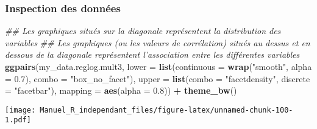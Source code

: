 \documentclass[
]{book}
\newenvironment{Shaded}{\begin{snugshade}}{\end{snugshade}}
\newcommand{\CommentTok}[1]{\textcolor[rgb]{0.56,0.35,0.01}{\textit{#1}}}
\newcommand{\DataTypeTok}[1]{\textcolor[rgb]{0.13,0.29,0.53}{#1}}
\newcommand{\FloatTok}[1]{\textcolor[rgb]{0.00,0.00,0.81}{#1}}
\newcommand{\KeywordTok}[1]{\textcolor[rgb]{0.13,0.29,0.53}{\textbf{#1}}}
\newcommand{\NormalTok}[1]{#1}
\newcommand{\OperatorTok}[1]{\textcolor[rgb]{0.81,0.36,0.00}{\textbf{#1}}}
\newcommand{\StringTok}[1]{\textcolor[rgb]{0.31,0.60,0.02}{#1}}
\begin{document}
\begin{Shaded}
\end{Shaded}

\hypertarget{inspection-des-donnuxe9es-10}{%
\subsubsection{Inspection des données}\label{inspection-des-donnuxe9es-10}}

\begin{Shaded}
\begin{Highlighting}[]
\CommentTok{## Les graphiques situés sur la diagonale représentent la distribution des variables}
\CommentTok{## Les graphiques (ou les valeurs de corrélation) situés au dessus et en dessous de la diagonale représentent l'association entre les différentes variables}
\KeywordTok{ggpairs}\NormalTok{(my_data.reglog.mult3,}
        \DataTypeTok{lower =} \KeywordTok{list}\NormalTok{(}\DataTypeTok{continuous =} \KeywordTok{wrap}\NormalTok{(}\StringTok{"smooth"}\NormalTok{, }\DataTypeTok{alpha =} \FloatTok{0.7}\NormalTok{), }\DataTypeTok{combo =} \StringTok{"box_no_facet"}\NormalTok{),}
        \DataTypeTok{upper =} \KeywordTok{list}\NormalTok{(}\DataTypeTok{combo =} \StringTok{"facetdensity"}\NormalTok{, }\DataTypeTok{discrete =} \StringTok{"facetbar"}\NormalTok{), }
        \DataTypeTok{mapping =} \KeywordTok{aes}\NormalTok{(}\DataTypeTok{alpha =} \FloatTok{0.8}\NormalTok{)) }\OperatorTok{+}\StringTok{ }\KeywordTok{theme_bw}\NormalTok{()}
\end{Highlighting}
\end{Shaded}

\texttt{[image: Manuel\_R\_independant\_files/figure-latex/unnamed-chunk-100-1.pdf]}
\end{document}

